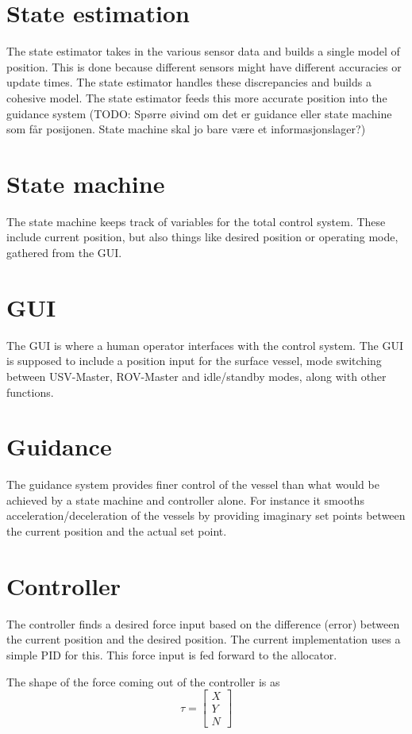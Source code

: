 \documentclass[class=article, crop=false, draft=true]{standalone}
\begin{document}
\section{State estimation}
The state estimator takes in the various sensor data and builds a single model of position. This is done because different sensors might have different accuracies or update times. The state estimator handles these discrepancies and builds a cohesive model. The state estimator feeds this more accurate position into the guidance system (TODO: Spørre øivind om det er guidance eller state machine som får posijonen. State machine skal jo bare være et informasjonslager?)

\section{State machine}
The state machine keeps track of variables for the total control system. These include current position, but also things like desired position or operating mode, gathered from the GUI.

\section{GUI}
The GUI is where a human operator interfaces with the control system. The GUI is supposed to include a position input for the surface vessel, mode switching between USV-Master, ROV-Master and idle/standby modes, along with other functions.

\section{Guidance}
The guidance system provides finer control of the vessel than what would be achieved by a state machine and controller alone. For instance it smooths acceleration/deceleration of the vessels by providing imaginary set points between the current position and the actual set point.

\section{Controller}
The controller finds a desired force input based on the difference (error) between the current position and the desired position. The current implementation uses a simple PID for this. This force input is fed forward to the allocator.

The shape of the force coming out of the controller is as \[\tau = \begin{bmatrix}X \\ Y \\ N\end{bmatrix}\]
\end{document}
